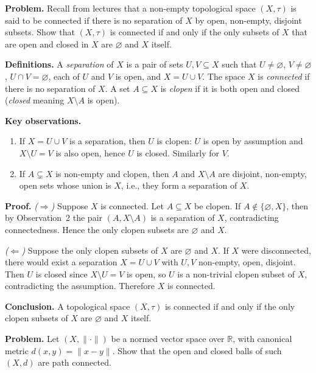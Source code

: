 \documentclass[12pt,a4paper]{article}
\theoremstyle{plain}
\theoremstyle{definition}
\theoremstyle{remark}
\theoremstyle{remark}
\begin{document}
	
\noindent\textbf{Problem.}
Recall from lectures that a non-empty topological space $(X,\tau)$ is said to be
connected if there is no separation of $X$ by open, non-empty, disjoint subsets.
Show that $(X,\tau)$ is connected if and only if the only subsets of $X$ that
are open and closed in $X$ are $\varnothing$ and $X$ itself.

\medskip
\noindent\textbf{Definitions.}
A \emph{separation} of $X$ is a pair of sets $U,V\subseteq X$ such that
$U\neq\varnothing$, $V\neq\varnothing$, $U\cap V=\varnothing$, each of $U$ and $V$ is open,
and $X=U\cup V$.
The space $X$ is \emph{connected} if there is no separation of $X$.
A set $A\subseteq X$ is \emph{clopen} if it is both open and closed
(\emph{closed} meaning $X\setminus A$ is open).

\medskip
\noindent\textbf{Key observations.}
\begin{enumerate}
	\item If $X=U\cup V$ is a separation, then $U$ is clopen: $U$ is open by assumption and
	$X\setminus U=V$ is also open, hence $U$ is closed. Similarly for $V$.
	\item If $A\subsetneq X$ is non-empty and clopen, then $A$ and $X\setminus A$ are disjoint,
	non-empty, open sets whose union is $X$, i.e., they form a separation of $X$.
\end{enumerate}

\medskip
\noindent\textbf{Proof.}
\emph{($\Rightarrow$)} Suppose $X$ is connected. Let $A\subseteq X$ be clopen.
If $A\notin\{\varnothing,X\}$, then by Observation~2 the pair $(A,X\setminus A)$ is a separation
of $X$, contradicting connectedness. Hence the only clopen subsets are $\varnothing$ and $X$.

\smallskip
\noindent
\emph{($\Leftarrow$)} Suppose the only clopen subsets of $X$ are $\varnothing$ and $X$.
If $X$ were disconnected, there would exist a separation $X=U\cup V$ with
$U,V$ non-empty, open, disjoint. Then $U$ is closed since $X\setminus U=V$ is open,
so $U$ is a non-trivial clopen subset of $X$, contradicting the assumption.
Therefore $X$ is connected.

\medskip
\noindent\textbf{Conclusion.}
A topological space $(X,\tau)$ is connected if and only if the only clopen subsets of $X$
are $\varnothing$ and $X$ itself.

\noindent\textbf{Problem.}
Let $(X,\|\cdot\|)$ be a normed vector space over $\mathbb{R}$, with canonical
metric $d(x,y)=\|x-y\|$. Show that the open and closed balls of such $(X,d)$
are path connected.
\end{document}
